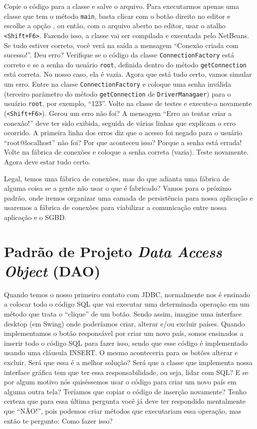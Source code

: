 Copie o código para a classe e salve o arquivo. Para executarmos apenas uma classe que tem o método \texttt{main}, basta clicar com o botão direito no editor e escolhe a opção , ou então, com o arquivo aberto no editor, usar o atalho \texttt{<Shift+F6>}. Fazendo isso, a classe vai ser compilada e executada pelo NetBeans. Se tudo estiver correto, você verá na saída a mensagem ``Conexão criada com sucesso!''. Deu erro? Verifique se o código da classe \texttt{ConnectionFactory} está correto e se a senha do usuário \texttt{root}, definida dentro do método \texttt{getConnection} está correta. No nosso caso, ela é vazia. Agora que está tudo certo, vamos simular um erro. Entre na classe \texttt{ConnectionFactory} e coloque uma senha inválida (terceiro parâmetro do método \texttt{getConnection} de \texttt{DriverManagaer}) para o usuário \texttt{root}, por exemplo, ``123''. Volte na classe de testes e execute-a novamente (\texttt{<Shift+F6>}). Gerou um erro não foi? A mensagem ``Erro ao tentar criar a conexão!'' deve ter sido exibida, seguida de várias linhas que explicam o erro ocorrido. A primeira linha dos erros diz que o acesso foi negado para o usuário ``root@localhost'' não foi? Por que aconteceu isso? Porque a senha está errada! Volte na fábrica de conexões e coloque a senha correta (vazia). Teste novamente. Agora deve estar tudo certo.

Legal, temos uma fábrica de conexões, mas do que adianta uma fábrica de alguma coisa se a gente não usar o que é fabricado? Vamos para o próximo padrão, onde iremos organizar uma camada de persistência para nossa aplicação e usaremos a fábrica de conexões para viabilizar a comunicação entre nossa aplicação e o SGBD.


\section{Padrão de Projeto \textit{Data Access Object} (DAO)}

Quando temos o nosso primeiro contato com JDBC, normalmente nos é ensinado a colocar todo o código SQL que vai executar uma determinada operação em um método que trata o ``clique'' de um botão. Sendo assim, imagine uma interface desktop (em Swing) onde poderíamos criar, alterar e/ou excluir países. Quando implementamos o botão responsável por criar um novo país, somos ensinados a inserir todo o código SQL para fazer isso, sendo que esse código é implementado usando uma cláusula INSERT. O mesmo aconteceria para os botões alterar e excluir. Será que essa é a melhor solução? Será que a classe que implementa nossa interface gráfica tem que ter essa responsabilidade, ou seja, lidar com SQL? E se por algum motivo nós quiséssemos usar o código para criar um novo país em alguma outra tela? Teríamos que copiar o código de inserção novamente? Tenho certeza que para essa última pergunta você já deve ter respondido mentalmente que ``NÃO!'', pois podemos criar métodos que executariam essa operação, mas então te pergunto: Como fazer isso?

